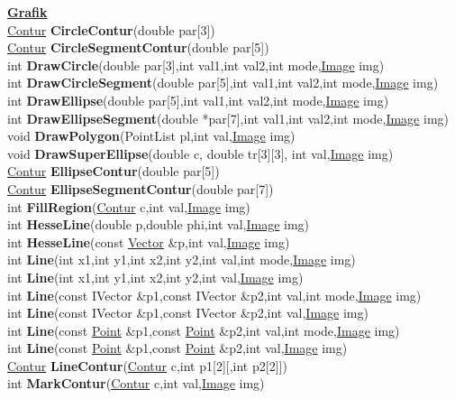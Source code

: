 \documentclass[10pt,titlepage]{article}
\newcommand{\subtitle}[1]{{\noindent\bf#1}}
\def\functionlistentry#1#2#3#4#5#6{\noindent #1 {\bf #2}(#3) \dotfill #6\\}
\begin{document}
{{\subtitle{\hyperlink{SECTION:graphics}{Grafik}}\\
\functionlistentry{\hyperlink{Contur}{Contur}}{CircleContur}{double par[3]}{1332}{graphics}{}
\functionlistentry{\hyperlink{Contur}{Contur}}{CircleSegmentContur}{double par[5]}{1334}{graphics}{}
\functionlistentry{int}{DrawCircle}{double par[3],int val1,int val2,int mode,\hyperlink{Image}{Image} img}{1325}{graphics}{}
\functionlistentry{int}{DrawCircleSegment}{double par[5],int val1,int val2,int mode,\hyperlink{Image}{Image} img}{1328}{graphics}{}
\functionlistentry{int}{DrawEllipse}{double par[5],int val1,int val2,int mode,\hyperlink{Image}{Image} img}{1326}{graphics}{}
\functionlistentry{int}{DrawEllipseSegment}{double *par[7],int val1,int val2,int mode,\hyperlink{Image}{Image} img}{1329}{graphics}{}
\functionlistentry{void}{DrawPolygon}{PointList pl,int val,\hyperlink{Image}{Image} img}{1330}{graphics}{}
\functionlistentry{void}{DrawSuperEllipse}{double c, double tr[3][3], int val,\hyperlink{Image}{Image} img}{1327}{graphics}{}
\functionlistentry{\hyperlink{Contur}{Contur}}{EllipseContur}{double par[5]}{1333}{graphics}{}
\functionlistentry{\hyperlink{Contur}{Contur}}{EllipseSegmentContur}{double par[7]}{1335}{graphics}{}
\functionlistentry{int}{FillRegion}{\hyperlink{Contur}{Contur} c,int val,\hyperlink{Image}{Image} img}{1337}{graphics}{}
\functionlistentry{int}{HesseLine}{double p,double phi,int val,\hyperlink{Image}{Image} img}{1323}{graphics}{}
\functionlistentry{int}{HesseLine}{const \hyperlink{Vector}{Vector} \&p,int val,\hyperlink{Image}{Image} img}{1324}{graphics}{}
\functionlistentry{int}{Line}{int x1,int y1,int x2,int y2,int val,int mode,\hyperlink{Image}{Image} img}{1317}{graphics}{}
\functionlistentry{int}{Line}{int x1,int y1,int x2,int y2,int val,\hyperlink{Image}{Image} img}{1318}{graphics}{}
\functionlistentry{int}{Line}{const IVector \&p1,const IVector \&p2,int val,int mode,\hyperlink{Image}{Image} img}{1319}{graphics}{}
\functionlistentry{int}{Line}{const IVector \&p1,const IVector \&p2,int val,\hyperlink{Image}{Image} img}{1320}{graphics}{}
\functionlistentry{int}{Line}{const \hyperlink{Point}{Point} \&p1,const \hyperlink{Point}{Point} \&p2,int val,int mode,\hyperlink{Image}{Image} img}{1321}{graphics}{}
\functionlistentry{int}{Line}{const \hyperlink{Point}{Point} \&p1,const \hyperlink{Point}{Point} \&p2,int val,\hyperlink{Image}{Image} img}{1322}{graphics}{}
\functionlistentry{\hyperlink{Contur}{Contur}}{LineContur}{\hyperlink{Contur}{Contur} c,int p1[2][,int p2[2]]}{1331}{graphics}{}
\functionlistentry{int}{MarkContur}{\hyperlink{Contur}{Contur} c,int val,\hyperlink{Image}{Image} img}{1336}{graphics}{}
}}
\end{document}

